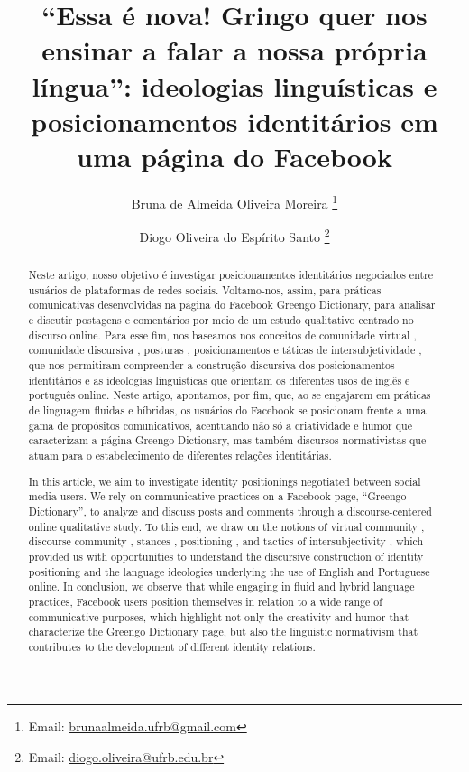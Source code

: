\documentclass[portuguese]{textolivre}
\title{“Essa é nova! Gringo quer nos ensinar a falar a nossa própria língua”: ideologias linguísticas e posicionamentos identitários em uma página do Facebook}
\author[1]{Bruna de Almeida Oliveira Moreira \orcid{0000-0001-8549-4844} \thanks{Email: \url{brunaalmeida.ufrb@gmail.com}}}
\author[1]{Diogo Oliveira do Espírito Santo \orcid{0000-0003-4805-4430} \thanks{Email: \url{diogo.oliveira@ufrb.edu.br}}}
\affil[1]{Universidade Federal do Recôncavo da Bahia, Centro de Formação de Professores, Amargosa, BA, Brasil.}
\begin{document}
\maketitle

\begin{polyabstract}
\begin{abstract}
Neste artigo, nosso objetivo é investigar posicionamentos identitários negociados entre usuários de plataformas de redes sociais. Voltamo-nos, assim, para práticas comunicativas desenvolvidas na página do Facebook Greengo Dictionary, para analisar e discutir postagens e comentários por meio de um estudo qualitativo centrado no discurso online. Para esse fim, nos baseamos nos conceitos de comunidade virtual \cite{recuero_comunidades_2009}, comunidade discursiva \cite{swales_repensando_1992,araujo_comunidade_2020}, posturas \cite{barton_linguagem_2015}, posicionamentos \cite{harre_positioning_1999} e táticas de intersubjetividade \cite{bucholtz_language_2004,bucholtz_identity_2005}, que nos permitiram compreender a construção discursiva dos posicionamentos identitários e as ideologias linguísticas \cite{moita_lopes_ingles_2008,moita_lopes_ideologia_2013} que orientam os diferentes usos de inglês e português online. Neste artigo, apontamos, por fim, que, ao se engajarem em práticas de linguagem fluidas e híbridas, os usuários do Facebook se posicionam frente a uma gama de propósitos comunicativos, acentuando não só a criatividade e humor que caracterizam a página Greengo Dictionary, mas também discursos normativistas que atuam para o estabelecimento de diferentes relações identitárias.

\end{abstract}

\begin{english}
\begin{abstract}
In this article, we aim to investigate identity positionings negotiated between social media users. We rely on communicative practices on a Facebook page, “Greengo Dictionary”, to analyze and discuss posts and comments through a discourse-centered online qualitative study. To this end, we draw on the notions of virtual community \cite{recuero_comunidades_2009}, discourse community \cite{swales_repensando_1992,araujo_comunidade_2020}, stances \cite{barton_linguagem_2015}, positioning \cite{harre_positioning_1999}, and tactics of intersubjectivity \cite{bucholtz_language_2004,bucholtz_identity_2005}, which provided us with opportunities to understand the discursive construction of identity positioning and the language ideologies underlying the use of English and Portuguese online. In conclusion, we observe that while engaging in fluid and hybrid language practices, Facebook users position themselves in relation to a wide range of communicative purposes, which highlight not only the creativity and humor that characterize the Greengo Dictionary page, but also the linguistic normativism that contributes to the development of different identity relations.


\end{abstract}
\end{english}
\end{polyabstract}
\end{document}
